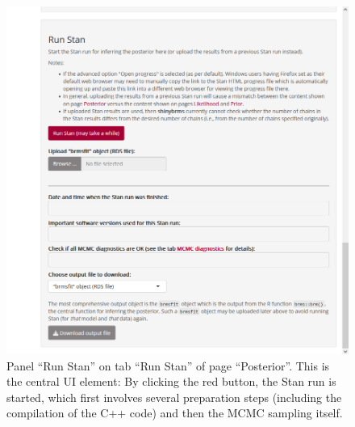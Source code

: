\begin{figure}[t!]
  \centering
  \includegraphics[width=\textwidth]{Figures/Posterior_Run_Run.png}
  \caption[Panel ``Run Stan'']{Panel ``Run Stan'' on tab ``Run Stan'' of page ``Posterior''.
  This is the central UI element: By clicking the red button, the Stan run
  is started, which first involves several preparation steps (including the
  compilation of the C++ code) and then the MCMC sampling itself.}
  \label{fig:post-run-run}
\end{figure}%

